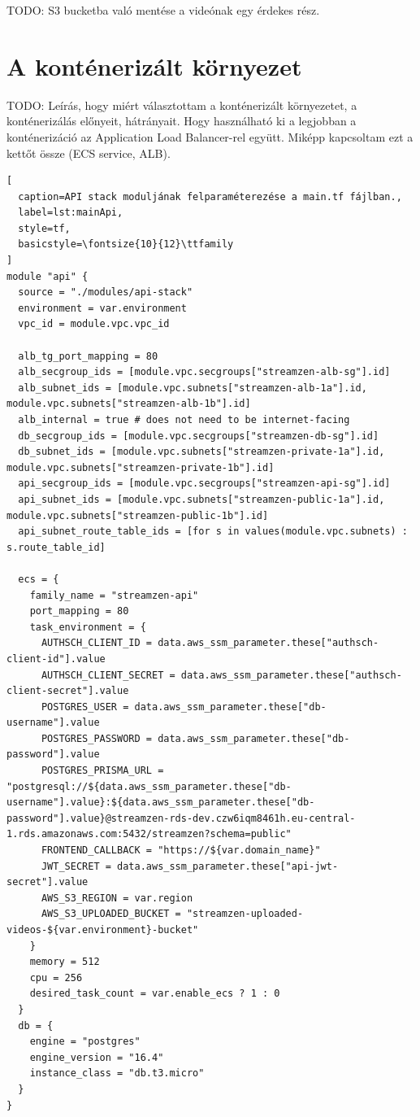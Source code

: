 TODO: S3 bucketba való mentése a videónak egy érdekes rész.

\section{A konténerizált környezet}

TODO: Leírás, hogy miért választottam a konténerizált környezetet, a konténerizálás előnyeit, hátrányait. Hogy használható ki a legjobban a konténerizáció az Application Load Balancer-rel együtt. Miképp kapcsoltam ezt a kettőt össze (ECS service, ALB).

\begin{minipage}{0.92\textwidth}
\begin{lstlisting}[
  caption=API stack moduljának felparaméterezése a main.tf fájlban.,
  label=lst:mainApi,
  style=tf,
  basicstyle=\fontsize{10}{12}\ttfamily
]
module "api" {
  source = "./modules/api-stack"
  environment = var.environment
  vpc_id = module.vpc.vpc_id

  alb_tg_port_mapping = 80
  alb_secgroup_ids = [module.vpc.secgroups["streamzen-alb-sg"].id]
  alb_subnet_ids = [module.vpc.subnets["streamzen-alb-1a"].id, module.vpc.subnets["streamzen-alb-1b"].id]
  alb_internal = true # does not need to be internet-facing
  db_secgroup_ids = [module.vpc.secgroups["streamzen-db-sg"].id]
  db_subnet_ids = [module.vpc.subnets["streamzen-private-1a"].id, module.vpc.subnets["streamzen-private-1b"].id]
  api_secgroup_ids = [module.vpc.secgroups["streamzen-api-sg"].id]
  api_subnet_ids = [module.vpc.subnets["streamzen-public-1a"].id, module.vpc.subnets["streamzen-public-1b"].id]
  api_subnet_route_table_ids = [for s in values(module.vpc.subnets) : s.route_table_id]

  ecs = {
    family_name = "streamzen-api"
    port_mapping = 80
    task_environment = {
      AUTHSCH_CLIENT_ID = data.aws_ssm_parameter.these["authsch-client-id"].value
      AUTHSCH_CLIENT_SECRET = data.aws_ssm_parameter.these["authsch-client-secret"].value
      POSTGRES_USER = data.aws_ssm_parameter.these["db-username"].value
      POSTGRES_PASSWORD = data.aws_ssm_parameter.these["db-password"].value
      POSTGRES_PRISMA_URL = "postgresql://${data.aws_ssm_parameter.these["db-username"].value}:${data.aws_ssm_parameter.these["db-password"].value}@streamzen-rds-dev.czw6iqm8461h.eu-central-1.rds.amazonaws.com:5432/streamzen?schema=public"
      FRONTEND_CALLBACK = "https://${var.domain_name}"
      JWT_SECRET = data.aws_ssm_parameter.these["api-jwt-secret"].value
      AWS_S3_REGION = var.region
      AWS_S3_UPLOADED_BUCKET = "streamzen-uploaded-videos-${var.environment}-bucket"
    }
    memory = 512
    cpu = 256
    desired_task_count = var.enable_ecs ? 1 : 0
  }
  db = {
    engine = "postgres"
    engine_version = "16.4"
    instance_class = "db.t3.micro"
  }
}
\end{lstlisting}
\end{minipage}

